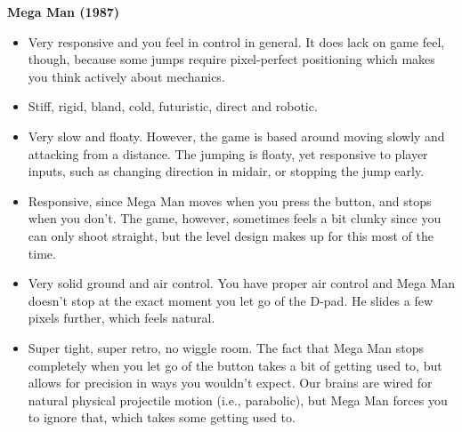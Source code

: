 \textbf{Mega Man (1987)}
\vspace{-5mm}
\begin{itemize}[noitemsep,nolistsep]
\item Very responsive and you feel in control in general. It does lack on game feel, though, because some jumps require pixel-perfect positioning which makes you think actively about mechanics.
\item Stiff, rigid, bland, cold, futuristic, direct and robotic.
\item Very slow and floaty. However, the game is based around moving slowly and attacking from a distance. The jumping is floaty, yet responsive to player inputs, such as changing direction in midair, or stopping the jump early. 
\item Responsive, since Mega Man moves when you press the button, and stops when you don't. The game, however, sometimes feels a bit clunky since you can only shoot straight, but the level design makes up for this most of the time.
\item Very solid ground and air control. You have proper air control and Mega Man doesn't stop at the exact moment you let go of the D-pad. He slides a few pixels further, which feels natural.
\item Super tight, super retro, no wiggle room. The fact that Mega Man stops completely when you let go of the button takes a bit of getting used to, but allows for precision in ways you wouldn't expect. Our brains are wired for natural physical projectile motion (i.e., parabolic), but Mega Man forces you to ignore that, which takes some getting used to.
\end{itemize}

